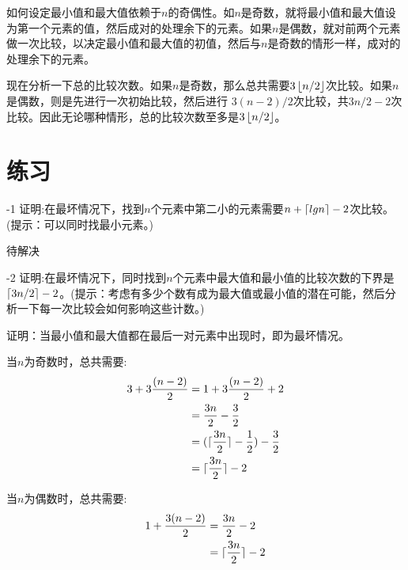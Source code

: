 \documentclass[a4paper,11pt]{ctexbook}
\begin{document}
如何设定最小值和最大值依赖于$ n $的奇偶性。如$ n $是奇数，就将最小值和最大值设为第一个元素的值，然后成对的处理余下的元素。如果$ n $是偶数，就对前两个元素做一次比较，以决定最小值和最大值的初值，然后与$ n $是奇数的情形一样，成对的处理余下的元素。

现在分析一下总的比较次数。如果$ n $是奇数，那么总共需要$ 3\left\lfloor n/2 \right\rfloor $次比较。如果$ n $是偶数，则是先进行一次初始比较，然后进行
$ 3(n-2)/2 $次比较，共$ 3n/2-2 $次比较。因此无论哪种情形，总的比较次数至多是$ 3\left\lfloor n/2 \right\rfloor $。

\section*{练习}

-1 证明:在最坏情况下，找到$ n $个元素中第二小的元素需要$ n + \lceil lgn \rceil - 2 $次比较。(提示：可以同时找最小元素。)

待解决

-2 证明:在最坏情况下，同时找到$ n $个元素中最大值和最小值的比较次数的下界是$ \lceil 3n/2 \rceil-2 $。(提示：考虑有多少个数有成为最大值或最小值的潜在可能，然后分析一下每一次比较会如何影响这些计数。)

证明：当最小值和最大值都在最后一对元素中出现时，即为最坏情况。

当$ n $为奇数时，总共需要:
\begin{equation}
\begin{split}
3+3\frac{(n-2)}{2} &= 1 + 3\frac{(n-2)}{2} + 2\\
&=\frac{3n}{2}-\frac{3}{2}\\
&=(\lceil \frac{3n}{2} \rceil-\frac{1}{2})-\frac{3}{2}\\
&=\lceil \frac{3n}{2} \rceil-2
\end{split}
\end{equation}

当$ n $为偶数时，总共需要:
\begin{equation}
\begin{split}
1+\frac{3(n-2)}{2}&=\frac{3n}{2}-2\\
&=\lceil \frac{3n}{2} \rceil-2
\end{split}
\end{equation}
\end{document}
